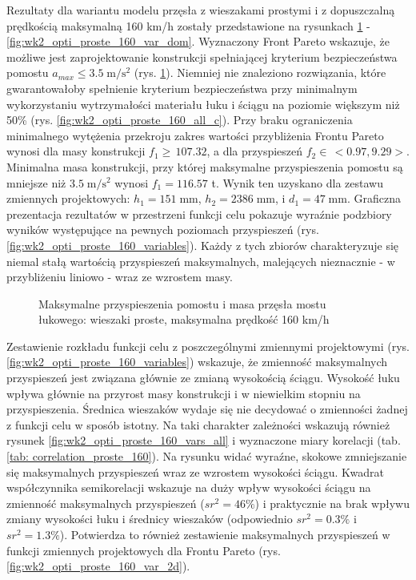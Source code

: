 Rezultaty dla wariantu modelu przęsła z wieszakami prostymi i z dopuszczalną prędkością maksymalną 160 km/h zostały przedstawione na rysunkach \ref{fig:wk2_opti_proste_160_all} - \ref{fig:wk2_opti_proste_160_var_dom}. Wyznaczony Front Pareto wskazuje, że możliwe jest zaprojektowanie konstrukcji spełniającej kryterium bezpieczeństwa pomostu $a_{max}\le 3.5\;\mathrm{m/s^2}$ (rys. \ref{fig:wk2_opti_proste_160_all}). Niemniej nie znaleziono rozwiązania, które gwarantowałoby spełnienie kryterium bezpieczeństwa przy minimalnym wykorzystaniu wytrzymałości materiału łuku i ściągu na poziomie większym niż 50\% (rys. \ref{fig:wk2_opti_proste_160_all_c}). Przy braku ograniczenia minimalnego wytężenia przekroju zakres wartości przybliżenia Frontu Pareto wynosi dla masy konstrukcji $f_1 \ge \,107.32$, a dla przyspieszeń $f_2 \in\,<0.97,9.29>$. Minimalna masa konstrukcji, przy której maksymalne przyspieszenia pomostu są mniejsze niż $3.5\;\mathrm{m/s^2}$ wynosi $f_1 = 116.57$ t. Wynik ten uzyskano dla zestawu zmiennych projektowych: $h_1 = 151\;\mathrm{mm}$, $h_2 = 2386\;\mathrm{mm}$, i $d_1 = 47\;\mathrm{mm}$. Graficzna prezentacja rezultatów w przestrzeni funkcji celu pokazuje wyraźnie podzbiory wyników występujące na pewnych poziomach przyspieszeń (rys. \ref{fig:wk2_opti_proste_160_variables}). Każdy z tych zbiorów charakteryzuje się niemal stałą wartością przyspieszeń maksymalnych, malejących nieznacznie - w przybliżeniu liniowo - wraz ze wzrostem masy.
\begin{figure}[hbt!]
	\centering
	\captionsetup{justification=centering}
	\caption{Maksymalne przyspieszenia pomostu i masa przęsła mostu łukowego: wieszaki proste, maksymalna prędkość 160 km/h}
	\label{fig:wk2_opti_proste_160_all}
\end{figure}

Zestawienie rozkładu funkcji celu z poszczególnymi zmiennymi projektowymi (rys. \ref{fig:wk2_opti_proste_160_variables}) wskazuje, że zmienność maksymalnych przyspieszeń jest związana głównie ze zmianą wysokością ściągu. Wysokość łuku wpływa głównie na przyrost masy konstrukcji i w niewielkim stopniu na przyspieszenia. Średnica wieszaków wydaje się nie decydować o zmienności żadnej z funkcji celu w sposób istotny. Na taki charakter zależności wskazują również rysunek \ref{fig:wk2_opti_proste_160_vars_all} i wyznaczone miary korelacji (tab. \ref{tab: correlation_proste_160}). Na rysunku widać wyraźne, skokowe zmniejszanie się maksymalnych przyspieszeń wraz ze wzrostem wysokości ściągu. Kwadrat współczynnika semikorelacji wskazuje na duży wpływ wysokości ściągu na zmienność maksymalnych przyspieszeń ($sr^2=46\%$) i praktycznie na brak wpływu zmiany wysokości łuku i średnicy wieszaków (odpowiednio $sr^2=0.3\%$ i $sr^2=1.3\%$). Potwierdza to również zestawienie maksymalnych przyspieszeń w funkcji zmiennych projektowych dla Frontu Pareto (rys. \ref{fig:wk2_opti_proste_160_var_2d}).

